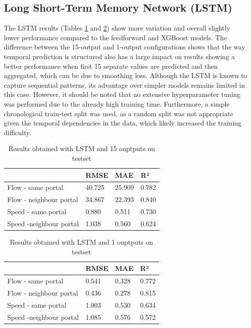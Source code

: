 	\subsection{Long Short-Term Memory Network (LSTM)}
	The LSTM results (Tables \ref{tab:result_LSTM_15output} and \ref{tab:result_LSTM_1output}) show more variation and overall slightly lower performance compared to the feedforward and XGBoost models.
	The difference between the 15-output and 1-output configurations shows that the way temporal prediction is structured also has a large impact on results showing a better performance when first 15 separate values are predicted and then aggregated, which can be due to smoothing loss.
	Although the LSTM is known to capture sequential patterns, its advantage over simpler models remains limited in this case. However, it should be noted that no extensive hyperparameter tuning was performed due to the already high training time. Furthermore, a simple chronological train-test split was used, as a random split was not appropriate given the temporal dependencies in the data, which likely increased the training difficulty.
	\begin{table}[H]
		\centering
		\caption{Results obtained with LSTM and 15 ouptputs on testset}
		\label{tab:result_LSTM_15output}
		\begin{tabular}{l|lll}
			& RMSE   & MAE    & R²    \\
			\hline
			Flow - same portal      &40.725& 25.909 & 0.782 \\
			Flow - neighbour portal &  34.867 & 22.393 & 0.840 \\
			Speed - same portal     &  0.880&0.511& 0.730 \\
			Speed -neighbour portal & 1.038 & 0.560 & 0.624
		\end{tabular}
	\end{table}
	\begin{table}[H]
		\centering
		\caption{Results obtained with LSTM and 1 ouptputs on testset}
		\label{tab:result_LSTM_1output}
		\begin{tabular}{l|lll}
			& RMSE   & MAE    & R²    \\
			\hline
			Flow - same portal      &0.541& 0.328& 0.772 \\
			Flow - neighbour portal &  0.436 & 0.278&0.815 \\
			Speed - same portal     & 1.003& 0.530 & 0.634 \\
			Speed -neighbour portal & 1.085 & 0.576 & 0.572
		\end{tabular}
	\end{table}

